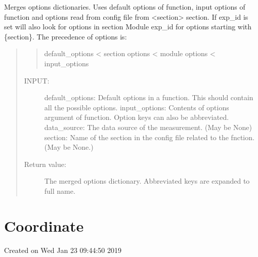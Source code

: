 \documentclass[letterpaper,10pt,english]{sphinxmanual}
\begin{document}

\begin{fulllineitems}
\label{\detokenize{config:flap.config.merge_options}}
Merges options dictionaries. Uses default options of function, input options of function and
options read from config file from \textless{}section\textgreater{} section. If exp\_id is set will also look for options
in section Module exp\_id for options starting with \{section\}.
The precedence of options is:
\begin{quote}
\begin{quote}

default\_options \textless{} section options \textless{} module options \textless{} input\_options
\end{quote}
\begin{description}
\item[{INPUT:}] \leavevmode
default\_options: Default options in a function. This should contain all the possible options.
input\_options: Contents of options argument of function. Option keys can also be abbreviated.
data\_source: The data source of the measurement. (May be None)
section: Name of the section in the config file related to the fnction. (May be None.)

\item[{Return value:}] \leavevmode
The merged options dictionary. Abbreviated keys are expanded to full name.

\end{description}
\end{quote}

\end{fulllineitems}



\section{Coordinate}
\label{\detokenize{coordinate:module-flap.coordinate}}\label{\detokenize{coordinate:coordinate}}\label{\detokenize{coordinate::doc}}
Created on Wed Jan 23 09:44:50 2019
\end{document}
